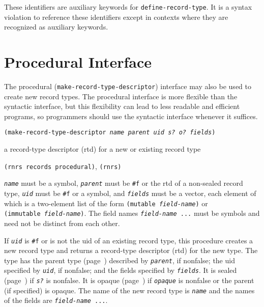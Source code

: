 These identifiers are auxiliary keywords for \texttt{define-record-type}.
It is a syntax violation to reference these identifiers except in
contexts where they are recognized as auxiliary keywords.



\section{\label{records_g140}\label{records_h2}Procedural Interface\label{records_SECTRECORDPROCEDURAL}}



\label{records_s17}\label{records_s18}\label{records_s19}The procedural (\texttt{make-record-type-descriptor}) interface may also be
used to create new record types.
The procedural interface is more flexible than the syntactic interface,
but this flexibility can lead to less readable and efficient programs, so
programmers should use the syntactic interface whenever it suffices.


\begin{description}

\label{records_s20}\item[procedure] \texttt{(make-record-type-descriptor \textit{name} \textit{parent} \textit{uid} \textit{s?} \textit{o?} \textit{fields})}



\item[returns] a record-type descriptor (rtd) for a new or existing record type


\item[libraries] \texttt{(rnrs records procedural)}, \texttt{(rnrs)}
\end{description}


\label{records_s21}\label{records_s22}\texttt{\textit{name}} must be a symbol, \texttt{\textit{parent}} must be \texttt{\#{}f} or the
rtd of a non-sealed record type, \texttt{\textit{uid}} must be \texttt{\#{}f} or
a symbol, and \texttt{\textit{fields}} must be a vector, each element of which
is a two-element list of the form \texttt{(mutable \textit{field-name})}
or \texttt{(immutable \textit{field-name})}.
The field names \texttt{\textit{field-name} ...} must be symbols and need
not be distinct from each other.


If \texttt{\textit{uid}} is \texttt{\#{}f} or is not the uid of an existing record
type, this procedure creates a new record type and returns a record-type
descriptor (rtd) for the new type. 
The type has the parent type (page \pageref{records_page_parent_type}) described by
\texttt{\textit{parent}}, if nonfalse; the uid specified by \texttt{\textit{uid}}, if nonfalse;
and the fields specified by \texttt{\textit{fields}}.
It is sealed (page \pageref{records_page_sealed}) if \texttt{\textit{s?}} is nonfalse.
It is opaque (page \pageref{records_page_opaque}) if \texttt{\textit{opaque}} is nonfalse or
the parent (if specified) is opaque.
The name of the new record type is \texttt{\textit{name}} and the names of the fields are
\texttt{\textit{field-name} ...}.


